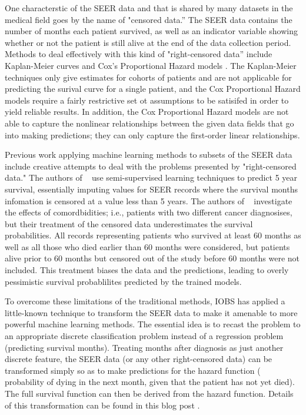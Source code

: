 \documentclass[a4paper,11pt]{article}
\begin{document}
One characterstic of the SEER data and that is shared by many datasets in the medical field 
goes by the name of "censored data.'' The SEER data contains the number of months each patient survived, as well as an indicator variable showing whether or not the patient is still alive at the end of the data collection period.
Methods to deal effectively with this kind of "right-censored data'' include Kaplan-Meier curves
and Cox's Proportional Hazard models \cite{cam}. The Kaplan-Meier techniques only give estimates for cohorts of patients and are not applicable for predicting the surival curve for a single patient, and the Cox Proportional Hazard models require a fairly restrictive set ot assumptions to be satisifed in order to yield reliable results. In addition, the Cox Proportional Hazard models are not able to capture the nonlinear relationships between the given data fields that go into making predictions; they can only capture the first-order linear relationships.

Previous work applying machine learning methods to subsets of the SEER data include creative attempts to deal with the problems presented by  "right-censored data." The authors of ~\cite{ISI:000337467400005} use semi-supervised learning techniques to predict 5 year survival, essentially imputing values for SEER records where the survival months infomation is censored at a value less than 5 years. The authors of ~\cite{ISI:000355882700012} investigate the effects of comordbidities; i.e., patients with two different cancer diagnosises, but their treatment of the censored data underestimates the survival probabilities. All records representing patients who survived at least 60 months as well as all those who died earlier than 60 months were considered, but patients alive prior to 60 months but censored out of the study before 60 months were not included. This treatment biases the data and the predictions, leading to overly pessimistic survival probablilites predicted by the trained models.

To overcome these limitations of the traditional methods, IOBS has applied a little-known technique to transform the SEER data to make it amenable to more powerful machine learning methods. The essential idea is to recast the problem to an appropriate discrete classification problem instead of a regression problem (predicting survival months). Treating months after diagnosis as just another discrete feature, the SEER data (or any other right-censored data) can be transformed simply so as to make predictions for the hazard function (
 probability of dying in the next month, given that the patient has not yet died).
The full survival function can then be derived from the hazard function.
Details of this transformation can be found in this blog post \cite{kuhn}.
\end{document}
